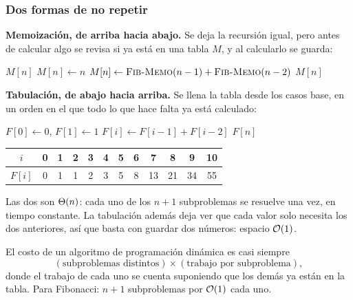 \documentclass[11pt,letterpaper]{article}
\begin{document}
\subsubsection*{Dos formas de no repetir}

\textbf{Memoización, de arriba hacia abajo.} Se deja la recursión
igual, pero antes de calcular algo se revisa si ya está en una tabla
$M$, y al calcularlo se guarda:

\begin{algorithm}[H]
\caption{\textsc{Fib-Memo}$(n)$, con $M$ inicializada en
         \textsc{nulo}}
\begin{algorithmic}[1]
  \State \Return $M[n]$ 
\EndIf
{}
  \State $M[n] \gets n$
\Else
  \State $M[n] \gets \textsc{Fib-Memo}(n-1) + \textsc{Fib-Memo}(n-2)$
\EndIf
\State \Return $M[n]$
\end{algorithmic}
\end{algorithm}

\textbf{Tabulación, de abajo hacia arriba.} Se llena la tabla desde
los casos base, en un orden en el que todo lo que hace falta ya está
calculado:

\begin{algorithm}[H]
\caption{\textsc{Fib-Tabla}$(n)$}
\begin{algorithmic}[1]
\State $F[0] \gets 0$, \quad $F[1] \gets 1$
  \State $F[i] \gets F[i-1] + F[i-2]$
\EndFor
\State \Return $F[n]$
\end{algorithmic}
\end{algorithm}

\begin{center}
\begin{tabular}{c*{11}{c}}
  \toprule
  $i$    & 0 & 1 & 2 & 3 & 4 & 5 & 6 & 7 & 8 & 9 & 10 \\
  \midrule
  $F[i]$ & 0 & 1 & 1 & 2 & 3 & 5 & 8 & 13 & 21 & 34 & 55 \\
  \bottomrule
\end{tabular}
\end{center}

Las dos son $\Theta\!\left(n\right)$: cada uno de los $n + 1$ subproblemas se
resuelve una vez, en tiempo constante. La tabulación además deja ver
que cada valor solo necesita los dos anteriores, así que basta con
guardar dos números: espacio $\mathcal{O}\!\left(1\right)$.

\begin{idea}
  El costo de un algoritmo de programación dinámica es casi siempre
  \[
    (\text{subproblemas distintos}) \times
    (\text{trabajo por subproblema}) ,
  \]
  donde el trabajo de cada uno se cuenta suponiendo que los demás ya
  están en la tabla. Para Fibonacci: $n + 1$ subproblemas por
  $\mathcal{O}\!\left(1\right)$ cada uno.
\end{idea}
\end{document}

